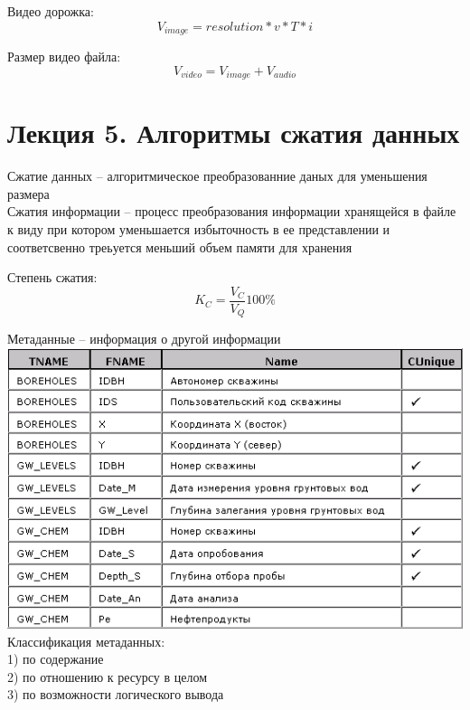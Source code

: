 \documentclass[a4paper, 12pt]{article}
\begin{document}
\begin{mdframed}[backgroundcolor=blue!20] 
      Видео дорожка:
       \[
         V_{image} = resolution * v * T * i
       \]

       Размер видео файла:
       \[
         V_{video} = V_{image} + V_{audio}
       \]
    \end{mdframed}



\newpage
\section*{Лекция 5. Алгоритмы сжатия данных}

Сжатие данных -- алгоритмическое преобразованние даных для уменьшения размера\\

Сжатия информации -- процесс преобразования информации хранящейся в файле к виду при котором уменьшается избыточность в ее представлении и соответсвенно треьуется меньший объем памяти для хранения\\

\begin{mdframed}[backgroundcolor=blue!20] 
       Степень сжатия:
       \[
         K_{C} = \frac{V_C}{V_Q} 100 \%
       \]
    \end{mdframed}
    

Метаданные -- информация о другой информации\\

\includegraphics{51}\\

Классификация метаданных:\\
1) по содержание\\
2) по отношению к ресурсу в целом\\
3) по возможности логического вывода\\
\end{document}
